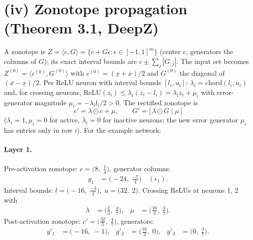 \documentclass[11pt]{article}
\begin{document}
\section{(iv) Zonotope propagation (Theorem 3.1, DeepZ)}
A zonotope is $Z = \langle c, G \rangle = \{c + G\epsilon : \epsilon \in [-1,1]^m\}$
(center $c$, generators the columns of $G$); its exact interval bounds are
$c \pm \sum_j |G_{:j}|$. The input set becomes $Z^{(0)} = \langle c^{(0)}, G^{(0)} \rangle$ with
$c^{(0)} = (\underline{x} + \overline{x})/2$ and $G^{(0)}$ the diagonal of $(\overline{x} - \underline{x})/2$.
Per ReLU neuron with interval bounds $[l_i, u_i]$:
$\lambda_i = \mathrm{chord}(l_i, u_i)$ and, for crossing neurons,
$\mathrm{ReLU}(z_i) \le \lambda_i (z_i - l_i) = \lambda_i z_i + \mu_i$ with error-generator magnitude
$\mu_i = -\lambda_i l_i / 2 > 0$. The rectified zonotope is
\begin{equation*}
c' = \lambda \odot c + \mu, \qquad G' = \bigl[\, \lambda \odot G \;\big|\; \mu\, \bigr]
\end{equation*}
($\lambda_i = 1, \mu_i = 0$ for active, $\lambda_i = 0$ for inactive neurons;
the new error generator $\mu_i$ has entries only in row $i$).
For the example network:
\paragraph{Layer 1.}
Pre-activation zonotope: $c = \bigl(8,\; \frac{1}{4}\bigr)$, generator columns:
\begin{align*}
g_{1} &= \bigl(-24,\; \frac{-7}{4}\bigr) \quad (\epsilon_{1}).
\end{align*}
Interval bounds: $l = \bigl(-16,\; \frac{-3}{2}\bigr), \; u = \bigl(32,\; 2\bigr)$. 
Crossing ReLUs at neurons 1, 2 with
\begin{align*}
\lambda &= \bigl(\frac{2}{3},\; \frac{4}{7}\bigr), & \mu &= \bigl(\frac{16}{3},\; \frac{3}{7}\bigr).
\end{align*}
Post-activation zonotope: $c' = \bigl(\frac{32}{3},\; \frac{4}{7}\bigr)$, generators:
\begin{align*}
g'_{1} &= \bigl(-16,\; -1\bigr), &
g'_{2} &= \bigl(\frac{16}{3},\; 0\bigr), &
g'_{3} &= \bigl(0,\; \frac{3}{7}\bigr).
\end{align*}
\end{document}
